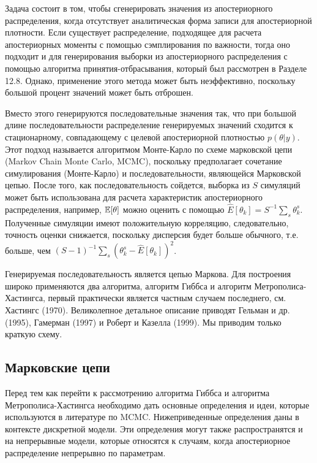 Задача состоит в том, чтобы сгенерировать значения из апостериорного распределения, когда отсутствует аналитическая форма записи для апостериорной плотности. Если существует распределение, подходящее для расчета апостериорных моменты с помощью сэмплирования по важности, тогда оно подходит и для генерирования выборки из апостериорного распределения с помощью алгоритма принятия-отбрасывания, который был рассмотрен в Разделе 12.8. Однако, применение этого метода может быть неэффективно, поскольку большой процент значений может быть отброшен.

Вместо этого генерируются последовательные значения так, что при большой длине последовательности распределение  генерируемых значений сходится к стационарному, совпадающему с целевой  апостериорной плотностью $p(\theta|y)$. Этот подход называется алгоритмом Монте-Карло по схеме марковской цепи (Markov Chain Monte Carlo, MCMC), поскольку предполагает сочетание симулирования (Монте-Карло) и последовательности, являющейся Марковской цепью. После того, как последовательность сойдется, выборка из $S$ симуляций может быть использована для расчета характеристик апостериорного распределения, например, $\mathbb{E}[\theta]$ можно оценить с помощью $\hat{E}[\theta_k]=S^{-1}\sum_{s}\theta^{s}_k$. Полученные симуляции имеют положительную корреляцию, следовательно, точность оценки снижается, поскольку дисперсия будет больше обычного, т.е. больше, чем $(S-1)^{-1}\sum_{s}(\theta^{s}_k-\hat{E}[\theta_k])^2$.

Генерируемая последовательность является цепью Маркова. Для построения широко применяются два алгоритма, алгоритм Гиббса и алгоритм Метрополиса-Хастингса, первый практически является частным случаем последнего, см. Хастингс (1970). Великолепное детальное описание приводят Гельман и др. (1995), Гамерман (1997) и Роберт и Казелла (1999). Мы приводим только краткую схему. 

\subsection{Марковские цепи}

Перед тем как перейти к рассмотрению алгоритма Гиббса и алгоритма Метрополиса-Хастингса необходимо дать основные определения и идеи, которые используются в литературе по MCMC. Нижеприведенные определения даны в контексте дискретной модели. Эти определения могут также распространятся и на непрерывные модели, которые относятся к случаям, когда апостериорное распределение непрерывно по параметрам.

